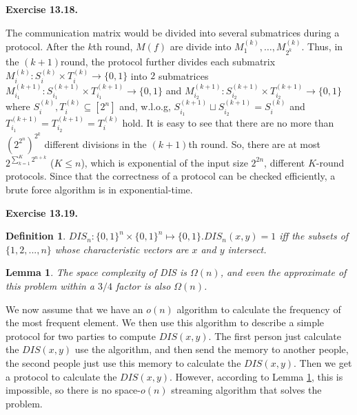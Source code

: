 \documentclass[a4paper]{article}
\newtheorem{lemma}{Lemma}
\newtheorem{definition}{Definition}
\newenvironment{exercise}[1]{
	\par
	\noindent\textbf{Exercise #1.}\quad
}{
	\par
	\bigskip
}
\begin{document}
    \begin{exercise}{13.18}
    	The communication matrix would be divided into several submatrices during a protocol. After the $k$th round, $M(f)$ are divide into $M^{(k)}_1, \ldots, M^{(k)}_{2^k}$. Thus, in the $(k + 1)$round, the protocol further divides each submatrix $M_i^{(k)}: S_i^{(k)}\times T_i^{(k)} \to \{0, 1\}$ into $2$ submatrices $M_{i_1}^{(k + 1)}: S_{i_1}^{(k + 1)}\times T_{i_1}^{(k + 1)} \to \{0, 1\}$ and $M_{i_2}^{(k + 1)}: S_{i_2}^{(k + 1)}\times T_{i_2}^{(k + 1)} \to \{0, 1\}$ where $S_i^{(k)}, T_i^{(k)} \subseteq [2^n]$ and, w.l.o.g, $S_{i_1}^{(k + 1)} \sqcup S_{i_2}^{(k + 1)} = S_i^{(k)}$ and $T_{i_1}^{(k + 1)} = T_{i_2}^{(k + 1)} = T_i^{(k)}$ hold. It is easy to see that there are no more than $(2^{2^n})^{2^k}$ different divisions in the $(k+1)$th round. So, there are at most $2^{\sum_{k = 1}^K2^{n+k}}$ ($K \leq n$), which is exponential of the input size $2^{2n}$, different $K$-round protocols. Since that the correctness of a protocol can be checked efficiently, a brute force algorithm is in exponential-time.
    \end{exercise}
    
    \begin{exercise}{13.19}
        \begin{definition}
             $DIS_n:\{0,1\}^n\times\{0,1\}^n \mapsto \{0,1\}.DIS_n(x,y) = 1$ iff  the subsets of $\{1, 2, . . . , n\}$ whose characteristic vectors are $x$ and $y$ intersect.
        \end{definition}
        \begin{lemma}
            The space complexity of DIS is $\Omega(n)$, and even the approximate of this problem within a $3/4$ factor is also $\Omega(n)$.
            \label{thm:DIS}
        \end{lemma}
        We now assume that we have an $o(n)$ algorithm to calculate the frequency of the most frequent element.  We then use this algorithm to describe a simple protocol for two parties to compute $DIS(x,y)$. The first person just calculate the $DIS(x,y)$ use the algorithm, and then send the memory to another people, the second people just use this memory to calculate the $DIS(x,y)$. Then we get a protocol to calculate the $DIS(x,y)$. However, according to Lemma \ref{thm:DIS}, this is impossible, so there is no space-$o(n)$ streaming algorithm that solves the problem.
    \end{exercise}
\end{document}

